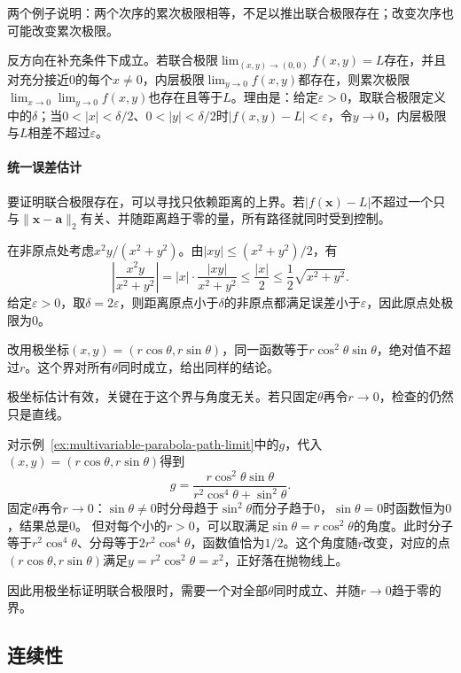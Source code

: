 两个例子说明：两个次序的累次极限相等，不足以推出联合极限存在；改变次序也可能改变累次极限。

反方向在补充条件下成立。若联合极限$\lim_{(x,y)\to(0,0)}f(x,y)=L$存在，并且对充分接近$0$的每个$x\neq0$，内层极限$\lim_{y\to0}f(x,y)$都存在，则累次极限$\lim_{x\to0}\lim_{y\to0}f(x,y)$也存在且等于$L$。理由是：给定$\varepsilon>0$，取联合极限定义中的$\delta$；当$0<|x|<\delta/2$、$0<|y|<\delta/2$时$|f(x,y)-L|<\varepsilon$，令$y\to0$，内层极限与$L$相差不超过$\varepsilon$。

\paragraph{统一误差估计}
要证明联合极限存在，可以寻找只依赖距离的上界。若$|f(\bm x)-L|$不超过一个只与$\lVert\bm x-\bm a\rVert_2$有关、并随距离趋于零的量，所有路径就同时受到控制。
\begin{example}[用距离上界证明联合极限]
\label{ex:multivariable-distance-bound-limit}
在非原点处考虑$x^2y/(x^2+y^2)$。由$|xy|\leq(x^2+y^2)/2$，有
\[
 \left|\frac{x^2y}{x^2+y^2}\right|
 =|x|\cdot\frac{|xy|}{x^2+y^2}
 \leq \frac{|x|}{2}
 \leq\frac12\sqrt{x^2+y^2}.
\]
给定$\varepsilon>0$，取$\delta=2\varepsilon$，则距离原点小于$\delta$的非原点都满足误差小于$\varepsilon$，因此原点处极限为$0$。

改用极坐标$(x,y)=(r\cos\theta,r\sin\theta)$，同一函数等于$r\cos^2\theta\sin\theta$，绝对值不超过$r$。这个界对所有$\theta$同时成立，给出同样的结论。
\end{example}

极坐标估计有效，关键在于这个界与角度无关。若只固定$\theta$再令$r\to0$，检查的仍然只是直线。
\begin{example}[固定角度的极坐标检验]
\label{ex:multivariable-polar-fixed-angle}
对示例~\ref{ex:multivariable-parabola-path-limit}中的$g$，代入$(x,y)=(r\cos\theta,r\sin\theta)$得到
\[
 g=\frac{r\cos^2\theta\sin\theta}{r^2\cos^4\theta+\sin^2\theta}.
\]
固定$\theta$再令$r\to0$：$\sin\theta\neq0$时分母趋于$\sin^2\theta$而分子趋于$0$，$\sin\theta=0$时函数恒为$0$，结果总是$0$。
但对每个小的$r>0$，可以取满足$\sin\theta=r\cos^2\theta$的角度。此时分子等于$r^2\cos^4\theta$、分母等于$2r^2\cos^4\theta$，函数值恰为$1/2$。这个角度随$r$改变，对应的点$(r\cos\theta,r\sin\theta)$满足$y=r^2\cos^2\theta=x^2$，正好落在抛物线上。
\end{example}

因此用极坐标证明联合极限时，需要一个对全部$\theta$同时成立、并随$r\to0$趋于零的界。

\subsection{连续性}
\label{sec:multivariable-continuity}

